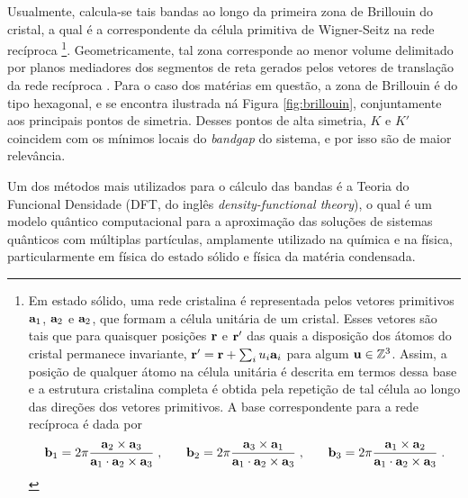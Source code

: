 Usualmente, calcula-se tais bandas ao longo da primeira zona de Brillouin do
cristal, a qual é a correspondente da célula primitiva de Wigner-Seitz na rede recíproca
\footnote{
  Em estado sólido, uma rede cristalina é representada pelos vetores primitivos
  $\mathbf{a}_1$, $\mathbf{a}_2$ e $\mathbf{a}_2$, que formam a célula unitária de um
  cristal. Esses vetores são tais que para quaisquer posições $\mathbf{r}$ e
  $\mathbf{r}'$ das quais a disposição dos átomos do cristal permanece invariante,
  $\mathbf{r}' = \mathbf{r} + \sum_i u_i \mathbf{a}_i $ para algum $ \mathbf{u} \in \mathbb{Z}^3$.
  Assim, a posição de qualquer átomo na célula unitária é descrita em termos dessa base e a
  estrutura cristalina completa é obtida pela repetição de tal célula ao longo das
  direções dos vetores primitivos. A base correspondente para a rede recíproca é
  dada por
  $$ 
    \mathbf{b}_1 = 2\pi\frac{\mathbf{a}_2 \times \mathbf{a}_3}{\mathbf{a}_1 \cdot \mathbf{a}_2 \times \mathbf{a}_3} \;\mathrm{,} \qquad 
    \mathbf{b}_2 = 2\pi\frac{\mathbf{a}_3 \times \mathbf{a}_1}{\mathbf{a}_1 \cdot \mathbf{a}_2 \times \mathbf{a}_3} \;\mathrm{,} \qquad
    \mathbf{b}_3 = 2\pi\frac{\mathbf{a}_1 \times \mathbf{a}_2}{\mathbf{a}_1 \cdot \mathbf{a}_2 \times \mathbf{a}_3} \;\mathrm{.} 
  $$
}. Geometricamente, tal zona corresponde ao menor volume delimitado por planos
mediadores dos segmentos de reta gerados pelos vetores de translação da rede recíproca
\cite{kittel2018introduction}. Para o caso dos matérias em questão, a zona de
Brillouin é do tipo hexagonal, e se encontra ilustrada ná Figura
\ref{fig:brillouin}, conjuntamente aos principais pontos de simetria. Desses
pontos de alta simetria, $K$ e $K'$ coincidem com os mínimos locais do
\textit{bandgap} do sistema, e por isso são de maior relevância.

Um dos métodos mais utilizados para o cálculo das bandas é a Teoria do Funcional
Densidade (DFT, do inglês \textit{density-functional theory}), o qual é um
modelo quântico computacional para a aproximação das soluções de sistemas
quânticos com múltiplas partículas, amplamente utilizado na química e na física,
particularmente em física do estado sólido e física da matéria condensada.

